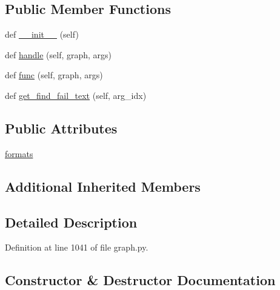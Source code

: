 \subsection*{Public Member Functions}
\begin{DoxyCompactItemize}
\item 
def \hyperlink{classlight__chats_1_1graph_1_1HitFunction_acd01defd21c4e2e69d7728458887c1b2}{\+\_\+\+\_\+init\+\_\+\+\_\+} (self)
\item 
def \hyperlink{classlight__chats_1_1graph_1_1HitFunction_afcc616271cdc3acede3dcabdfe516598}{handle} (self, graph, args)
\item 
def \hyperlink{classlight__chats_1_1graph_1_1HitFunction_a5154430a7ff1b987446b904c8238eef2}{func} (self, graph, args)
\item 
def \hyperlink{classlight__chats_1_1graph_1_1HitFunction_a3682574dfb01b39b2cec972e8a90d762}{get\+\_\+find\+\_\+fail\+\_\+text} (self, arg\+\_\+idx)
\end{DoxyCompactItemize}
\subsection*{Public Attributes}
\begin{DoxyCompactItemize}
\item 
\hyperlink{classlight__chats_1_1graph_1_1HitFunction_a52f8cfade8a8bd90e48e125bc2232e44}{formats}
\end{DoxyCompactItemize}
\subsection*{Additional Inherited Members}


\subsection{Detailed Description}
\begin{DoxyVerb}
\end{DoxyVerb}
 

Definition at line 1041 of file graph.\+py.



\subsection{Constructor \& Destructor Documentation}
\mbox{\label{classlight__chats_1_1graph_1_1HitFunction_acd01defd21c4e2e69d7728458887c1b2}} 
